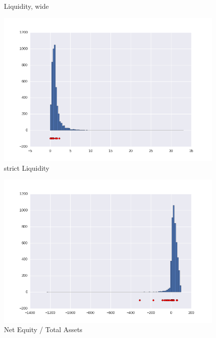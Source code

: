 \documentclass[DIV=calc, paper=a4, fontsize=11pt, twocolumn]{scrartcl}
\begin{document}
\begin{appendices}
\begin{figure}[h]
    \caption{Liquidity, wide}
\end{figure}
\begin{figure}[h]
  \centering
  \includegraphics[width=0.8\linewidth]{r14.png}
  \caption{strict Liquidity}
\end{figure}
\begin{figure}[h]
  \centering
  \includegraphics[width=0.8\linewidth]{r19.png}
  \caption{Net Equity / Total Assets}
\end{figure}
\clearpage


\end{appendices}
\end{document}
